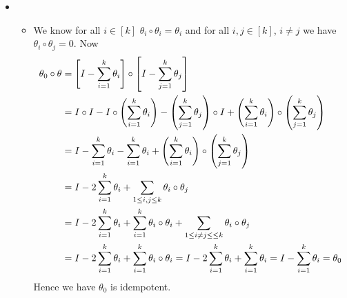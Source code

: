 \documentclass[a4paper, 11pt]{article}
\begin{document}
{\begin{itemize}
\begin{itemize}
	\item 	\textbf{Backward Direction $\boldsymbol{(\Leftarrow)}$:} Suppose $V=\Im\theta\oplus \ker\theta$. For any $v\in V$, $\exs!\ u\in\Im\theta,\ w\in\ker\theta$, such that $v=u+w$. Since $\theta(v)$ is the projection of $v$ onto $\Im\theta$ we have $u=\theta(v)$. Then $v=\theta(v)+w$ where $\theta(w)=0$. Hence we have $$\theta(v)=\theta(\theta(v)+w)=\theta\circ\theta(v)+\theta(w)=\theta\circ\theta(v)$$Hence we have for all $v\in V$, $\theta(v)=\theta\circ\theta(v)$. Therefore $\theta \circ\theta=\theta$ i.e. $\theta$ is idempotent.
	\end{itemize}
Hence we have $\theta $ is idempotent $\iff V=\Im\theta\oplus \ker\theta$ and for all $v\in V$, $\theta(v)$ is just the projection of $v$ onto  $\Im\theta$. 
\item \begin{itemize}
	\item We know for all $i\in[k]$ $\theta_i\circ\theta_i=\theta_i$ and for all $i,j\in[k]$, $i\neq j$ we have $\theta_i\circ\theta_j=0$. Now \begin{align*}
		\theta_0\circ \theta & =  \left[I-\sum_{i=1}^k\theta_i\right]\circ\left[I-\sum_{j=1}^k\theta_j\right]\\
		& = I\circ I -I\circ\left(\sum_{i=1}^k\theta_i\right) - \left(\sum_{j=1}^k\theta_j\right)\circ I +\left(\sum_{i=1}^k\theta_i\right)\circ \left(\sum_{j=1}^k\theta_j\right)\\
		& = I-\sum_{i=1}^k\theta_i-\sum_{i=1}^k\theta_i+\left(\sum_{i=1}^k\theta_i\right)\circ \left(\sum_{j=1}^k\theta_j\right)\\
		& = I-2\sum_{i=1}^k\theta_i+\sum_{1\leq i,j\leq k}\theta_i\circ \theta_j\\
		& =  I-2\sum_{i=1}^k\theta_i+\sum_{i=1}^k\theta_i\circ\theta_i+\sum_{1\leq i\neq j\leq \leq k}\theta_i\circ \theta_j\\
		& = I-2\sum_{i=1}^k\theta_i+\sum_{i=1}^k\theta_i\circ\theta_i = I-2\sum_{i=1}^k\theta_i+\sum_{i=1}^k\theta_i = I-\sum_{i=1}^k\theta_i=\theta_0
	\end{align*}Hence we have $\theta_0$ is idempotent. 
	

\end{itemize}
\end{itemize}}
\end{document}
